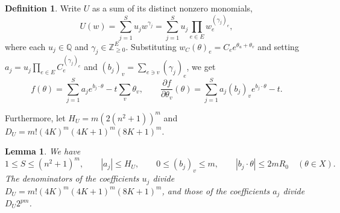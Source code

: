 \documentclass[11pt,reqno,letterpaper]{amsart}
\numberwithin{equation}{section}
\newtheorem{lemma}[lemma]{Lemma}
\theoremstyle{definition}
\newtheorem{definition}[definition]{Definition}
\theoremstyle{remark}
\newcommand{\Q}{\mathbb Q}
\begin{document}
\begin{definition}
    Write $U$ as a sum of its distinct nonzero monomials,
\[
 U(w)=\sum_{j=1}^S u_jw^{\gamma_j}
     =\sum_{j=1}^S u_j\prod_{e\in E}w_e^{(\gamma_j)_e},
\]
where each $u_j\in\Q$ and
$\gamma_j\in\mathbb Z_{\ge0}^E$.
Substituting $w_C(\theta)_e=C_ee^{\theta_u+\theta_v}$ and setting
$a_j=u_j\prod_{e\in E}C_e^{(\gamma_j)_e}$ and
$(b_j)_v=\sum_{e\ni v}(\gamma_j)_e$, we get
\[
 f(\theta)=\sum_{j=1}^S a_je^{b_j\cdot\theta}-t\sum_v\theta_v,
 \qquad
 \frac{\partial f}{\partial\theta_v}(\theta)
 =\sum_{j=1}^S a_j(b_j)_ve^{b_j\cdot\theta}-t.
\]
\end{definition}

Furthermore, let $H_U=m(2(n^2+1))^m$ and $D_U=m!(4K)^m(4K+1)^m(8K+1)^m$. 

\begin{lemma}\label{obs:U-coeffs} 
We have
\[
 1\le S\le(n^2+1)^m,\qquad
 |a_j|\le H_U,\qquad
 0\le(b_j)_v\le m,\qquad
 |b_j\cdot\theta|\le2mR_0\quad(\theta\in X).
\]
The denominators of the coefficients $u_j$ divide $D_U=m!(4K)^m(4K+1)^m(8K+1)^m$,
and those of the coefficients $a_j$ divide $D_U2^{pm}$.
\end{lemma}
\end{document}
